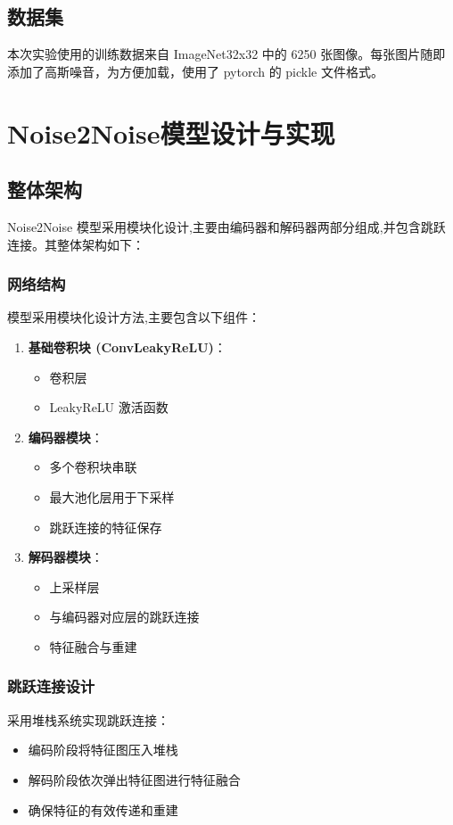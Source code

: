 \documentclass[UTF8]{ctexart}
\begin{document}
\subsection{数据集}

本次实验使用的训练数据来自 ImageNet32x32 中的 6250 张图像。每张图片随即添加了高斯噪音，为方便加载，使用了 pytorch 的 pickle 文件格式。

\section{Noise2Noise模型设计与实现}
\subsection{整体架构}

Noise2Noise 模型采用模块化设计,主要由编码器和解码器两部分组成,并包含跳跃连接。其整体架构如下：

\subsubsection{网络结构}
模型采用模块化设计方法,主要包含以下组件：
\begin{enumerate}
    \item \textbf{基础卷积块 (ConvLeakyReLU)}：
    \begin{itemize}
        \item 卷积层
        \item LeakyReLU 激活函数
    \end{itemize}
    \item \textbf{编码器模块}：
    \begin{itemize}
        \item 多个卷积块串联
        \item 最大池化层用于下采样
        \item 跳跃连接的特征保存
    \end{itemize}
    \item \textbf{解码器模块}：
    \begin{itemize}
        \item 上采样层
        \item 与编码器对应层的跳跃连接
        \item 特征融合与重建
    \end{itemize}
\end{enumerate}

\subsubsection{跳跃连接设计}
采用堆栈系统实现跳跃连接：
\begin{itemize}
    \item 编码阶段将特征图压入堆栈
    \item 解码阶段依次弹出特征图进行特征融合
    \item 确保特征的有效传递和重建
\end{itemize}
\end{document}
